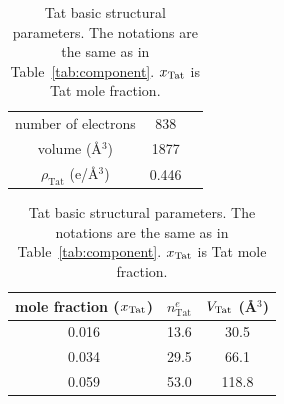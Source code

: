 \begin{table}[htbp]
  \centering
  \begin{tabular}{c c c}
    \hline
    number of electrons & 838 \\ 
    volume (\AA$^3$) & 1877 \\
    $\rho_\textrm{Tat}$ (e/\AA$^3$) & 0.446 \\
    \hline
  \end{tabular}
  \quad
  \begin{tabular}{ ccc }
    \hline
    mole fraction ($x_\textrm{Tat}$) & $n^e_\textrm{Tat}$ & $V_\textrm{Tat}$ (\AA$^3$) \\    
    \hline
    0.016 & 13.6 & 30.5 \\
    0.034 & 29.5 & 66.1 \\
    0.059 & 53.0 & 118.8 \\
    \hline
  \end{tabular}
  \caption{Tat basic structural parameters. The notations are the same
  as in Table~\ref{tab:component}. $x_\textrm{Tat}$ is Tat mole fraction.}
  \label{tab:Tat_basic_params}
\end{table}


